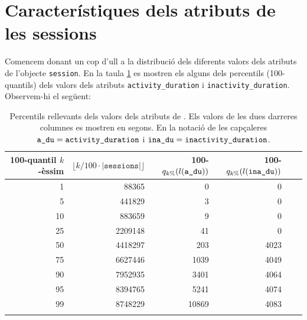 \documentclass[
	a4paper,
	twoside,
	justified
]{tufte-book}
\begin{document}
\section{Característiques dels atributs de les sessions}

Comencem donant un cop d'ull a la distribució dels diferents valors dels atributs de l'objecte \texttt{session}. En la taula \ref{tab:percentiles_sessions} es mostren els alguns dels percentils (100-quantils) dels valors dels atributs \texttt{activity\_duration} i \texttt{inactivity\_duration}. Observem-hi el següent:  

\begin{table}
\begin{center}
\begin{tabular}{rrrrrr}
\toprule
100-quantil $k$-èssim   &
  $\lfloor k/100 \cdot |\texttt{sessions}| \rfloor$ &
   100-$q_{k\%}(l(\texttt{a\_du}))$ &
   100-$q_{k\%}(l(\texttt{ina\_du}))$ \\
\midrule
1 & 88365 & 0 & 0 \\ 
5 & 441829 & 3 & 0 \\ 
10 & 883659 & 9 & 0 \\ 
25 & 2209148 & 41 & 0 \\ 
50 & 4418297 & 203 & 4023 \\ 
75 & 6627446 & 1039 & 4049 \\ 
90 & 7952935 & 3401 & 4064 \\ 
95 & 8394765 & 5241 & 4074 \\ 
99 & 8748229 & 10869 & 4083 \\ 
\bottomrule \\
\end{tabular}
\end{center}
\caption{
	\label{tab:percentiles_sessions}
  Percentils rellevants dels valors dels atributs de . Els valors de les dues darreres columnes es mostren en segons. En la notació de les capçaleres $\texttt{a\_du} = \texttt{activity\_duration}$ i $\texttt{ina\_du} = \texttt{inactivity\_duration}$.  
}
\end{table}
\end{document}
